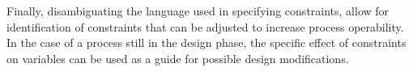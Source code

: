 \documentclass[final,authoryear,5pt,times,twocolumn]{elsarticle}
\begin{document}
Finally, disambiguating the language used in specifying constraints, allow for identification of constraints that can be adjusted to increase process operability.
In the case of a process still in the design phase, the specific effect of constraints on variables can be used as a guide for possible design modifications. 



\end{document}
